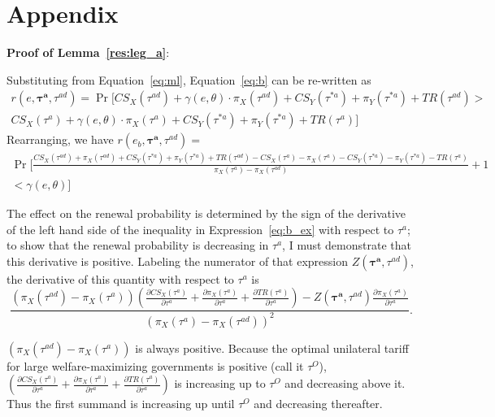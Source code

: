 \documentclass[10pt]{article}
\newcommand{\ve}{\theta}
\newcommand{\bta}{\bm{\tau^a}}
\newcommand{\tad}{\tau^{ad}}
\newcommand{\ga}{\gamma}
\begin{document}
\section{Appendix}
\label{sec:appendix}
\noindent \textbf{\hypertarget{Pr_leg_a}{Proof of Lemma~\ref{res:leg_a}}}:

Substituting from Equation~\ref{eq:ml}, Equation~\ref{eq:b} can be re-written as
\begin{multline}  
  r(e,\bta,\tad) = \Pr [ \mathit{CS}_X(\tad) + \ga(e,\ve) \cdot \pi_X(\tad) + \mathit{CS}_Y(\tau^{*a}) + \pi_Y(\tau^{*a}) + \mathit{TR}(\tad) >  \\ \mathit{CS}_X(\tau^a) + \ga(e,\ve) \cdot \pi_X(\tau^a) + \mathit{CS}_Y(\tau^{*a}) + \pi_Y(\tau^{*a}) + \mathit{TR}(\tau^a) ]
\end{multline}
Rearranging, we have $r(e_b,\bta,\tad) = $
\begin{multline}  
  \textstyle \Pr \Big[ \frac{\mathit{CS}_X(\tad) + \pi_X(\tad) + \mathit{CS}_Y(\tau^{*a}) + \pi_Y(\tau^{*a}) + \mathit{TR}(\tad)  -\mathit{CS}_X(\tau^a) - \pi_X(\tau^a) - \mathit{CS}_Y(\tau^{*a}) - \pi_Y(\tau^{*a}) - \mathit{TR}(\tau^a)}{\pi_X(\tau^a) - \pi_X(\tad)} + 1 \\ \textstyle < \ga(e,\ve) \Big]
  \label{eq:b_ex}
\end{multline}

The effect on the renewal probability is determined by the sign of the derivative of the left hand side of the inequality in Expression~\ref{eq:b_ex} with respect to $\tau^a$; to show that the renewal probability is decreasing in $\tau^a$, I must demonstrate that this derivative is positive. Labeling the numerator of that expression $Z(\bta,\tad)$, the derivative of this quantity with respect to $\tau^{a}$ is 
\begin{equation}
  \frac{\left(\pi_X(\tad) - \pi_X(\tau^a)\right)\left(\frac{\partial \mathit{CS}_X(\tau^{a})}{\partial \tau^{a}} + \frac{\partial \pi_X(\tau^a)}{\partial \tau^{a}} + \frac{\partial \mathit{TR}(\tau^{a})}{\partial \tau^{a}}\right) - Z(\bta,\tad) \frac{\partial \pi_X(\tau^a)}{\partial \tau^a}}{\left(\pi_X(\tau^a) - \pi_X(\tad)\right)^2}.
  \label{appex:a}
\end{equation}

\noindent $\left(\pi_X(\tad) - \pi_X(\tau^a)\right)$ is always positive. Because the optimal unilateral tariff for large welfare-maximizing governments is positive (call it $\tau^O$), $\left(\frac{\partial \mathit{CS}_X(\tau^{a})}{\partial \tau^{a}} + \frac{\partial \pi_X(\tau^a)}{\partial \tau^{a}} + \frac{\partial \mathit{TR}(\tau^{a})}{\partial \tau^{a}}\right)$ is increasing up to $\tau^O$ and decreasing above it. Thus the first summand is increasing up until $\tau^O$ and decreasing thereafter.
\end{document}
